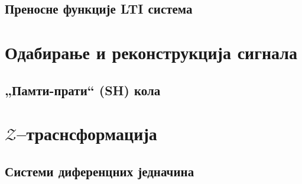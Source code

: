 \subsection{Преносне функције LTI система}

\setcounter{fid}{0}
\graphicspath{{./4_laplasova_transformacija/3_fje_prenosa/}}
\noindent

\vspace*{\ProblemSep}
\section{Одабирање и реконструкција сигнала}
\subsection{„Памти-прати“ (SH) кола}

\setcounter{fid}{0}
\graphicspath{{./5_odabiranje/1_kola/}}
\noindent

\vspace*{\ProblemSep}
\section{$\mathcal{Z}$--траснсформација}
\subsection{Системи диференцних једначина}

\setcounter{fid}{0}
\graphicspath{{./6_z_transformacija/2_sistemi/}}
\noindent

\vspace*{\ProblemSep}
\appendix
\appendix
\graphicspath{{./100_appendix/}}



